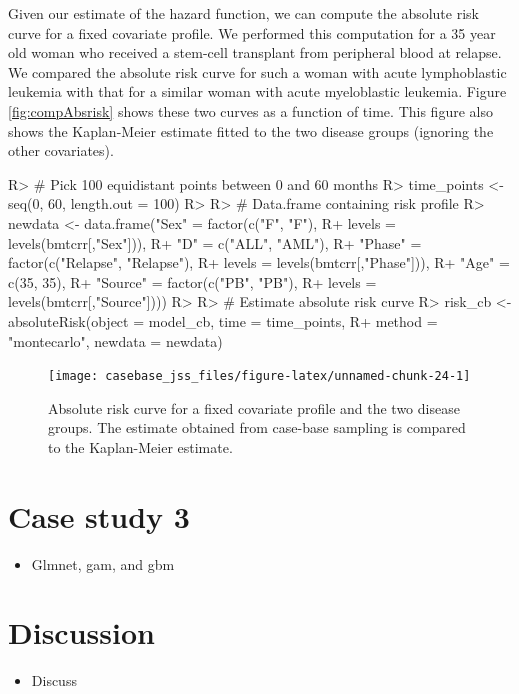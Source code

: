 \documentclass[article]{jss}
\providecommand{\tightlist}{%
  \setlength{\itemsep}{0pt}\setlength{\parskip}{0pt}}
\begin{document}
Given our estimate of the hazard function, we can compute the absolute
risk curve for a fixed covariate profile. We performed this computation
for a 35 year old woman who received a stem-cell transplant from
peripheral blood at relapse. We compared the absolute risk curve for
such a woman with acute lymphoblastic leukemia with that for a similar
woman with acute myeloblastic leukemia. Figure \ref{fig:compAbsrisk}
shows these two curves as a function of time. This figure also shows the
Kaplan-Meier estimate fitted to the two disease groups (ignoring the
other covariates).

\begin{CodeChunk}

\begin{CodeInput}
R> # Pick 100 equidistant points between 0 and 60 months
R> time_points <- seq(0, 60, length.out = 100)
R> 
R> # Data.frame containing risk profile
R> newdata <- data.frame("Sex" = factor(c("F", "F"), 
R+                                      levels = levels(bmtcrr[,"Sex"])),
R+                       "D" = c("ALL", "AML"),
R+                       "Phase" = factor(c("Relapse", "Relapse"), 
R+                                        levels = levels(bmtcrr[,"Phase"])),
R+                       "Age" = c(35, 35),
R+                       "Source" = factor(c("PB", "PB"), 
R+                                         levels = levels(bmtcrr[,"Source"])))
R> 
R> # Estimate absolute risk curve
R> risk_cb <- absoluteRisk(object = model_cb, time = time_points,
R+                         method = "montecarlo", newdata = newdata)
\end{CodeInput}
\end{CodeChunk}

\begin{CodeChunk}
\begin{figure}

{\centering \texttt{[image: casebase\_jss\_files/figure-latex/unnamed-chunk-24-1]} 

}

\caption{\label{fig:compAbsrisk}Absolute risk curve for a fixed covariate profile and the two disease groups. The estimate obtained from case-base sampling is compared to the Kaplan-Meier estimate.}\label{fig:unnamed-chunk-24}
\end{figure}
\end{CodeChunk}

\section{Case study 3}\label{case-study-3}

\begin{itemize}
\tightlist
\item
  Glmnet, gam, and gbm
\end{itemize}

\section{Discussion}\label{discussion}

\begin{itemize}
\tightlist
\item
  Discuss
\end{itemize}


\end{document}
